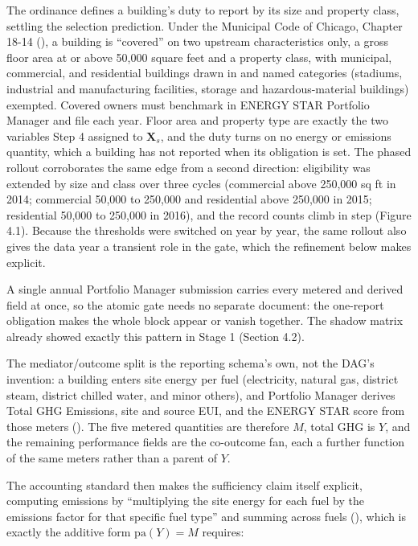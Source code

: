 The ordinance defines a building's duty to report by its size and property class, settling the selection prediction. Under the Municipal Code of Chicago, Chapter 18-14 (), a building is ``covered'' on two upstream characteristics only, a gross floor area at or above 50,000 square feet and a property class, with municipal, commercial, and residential buildings drawn in and named categories (stadiums, industrial and manufacturing facilities, storage and hazardous-material buildings) exempted. Covered owners must benchmark in ENERGY STAR Portfolio Manager and file each year. Floor area and property type are exactly the two variables Step 4 assigned to $\mathbf{X}_s$, and the duty turns on no energy or emissions quantity, which a building has not reported when its obligation is set. The phased rollout corroborates the same edge from a second direction: eligibility was extended by size and class over three cycles (commercial above 250,000 sq ft in 2014; commercial 50,000 to 250,000 and residential above 250,000 in 2015; residential 50,000 to 250,000 in 2016), and the record counts climb in step (Figure 4.1). Because the thresholds were switched on year by year, the same rollout also gives the data year a transient role in the gate, which the refinement below makes explicit.

A single annual Portfolio Manager submission carries every metered and derived field at once, so the atomic gate needs no separate document: the one-report obligation makes the whole block appear or vanish together. The shadow matrix already showed exactly this pattern in Stage 1 (Section 4.2).

The mediator/outcome split is the reporting schema's own, not the DAG's invention: a building enters site energy per fuel (electricity, natural gas, district steam, district chilled water, and minor others), and Portfolio Manager derives Total GHG Emissions, site and source EUI, and the ENERGY STAR score from those meters (). The five metered quantities are therefore $M$, total GHG is $Y$, and the remaining performance fields are the co-outcome fan, each a further function of the same meters rather than a parent of $Y$.

The accounting standard then makes the sufficiency claim itself explicit, computing emissions by ``multiplying the site energy for each fuel by the emissions factor for that specific fuel type'' and summing across fuels (), which is exactly the additive form $\mathrm{pa}(Y) = M$ requires:

